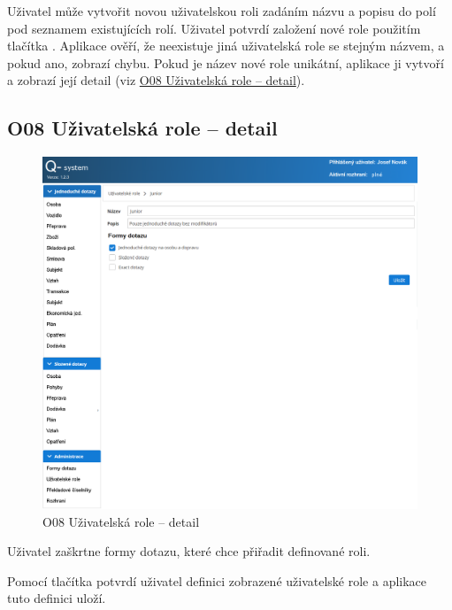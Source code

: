 \documentclass[thesis=M,czech]{FITthesis}[2019/12/23]
\begin{document}
Uživatel může vytvořit novou uživatelskou roli zadáním názvu a popisu do polí pod seznamem existujících rolí. Uživatel potvrdí založení nové role použitím tlačítka . Aplikace ověří, že neexistuje jiná uživatelská role se stejným názvem, a pokud ano, zobrazí chybu. Pokud je název nové role unikátní, aplikace ji vytvoří a zobrazí její detail (viz \hyperref[O08UzivatelskaRoleDetail]{O08 Uživatelská role – detail}).

\subsection{O08 Uživatelská role -- detail}
\label{O08UzivatelskaRoleDetail}
\begin{figure}[H]
  \centering
  \includegraphics[width=\textwidth]{res/screens/O08 Uživatelská role - detail}
  \caption{O08 Uživatelská role -- detail}
  \label{fig:O08 Uživatelská role -- detail}
\end{figure}

Uživatel zaškrtne formy dotazu, které chce přiřadit definované roli.

Pomocí tlačítka  potvrdí uživatel definici zobrazené uživatelské role a aplikace tuto definici uloží.
\end{document}
